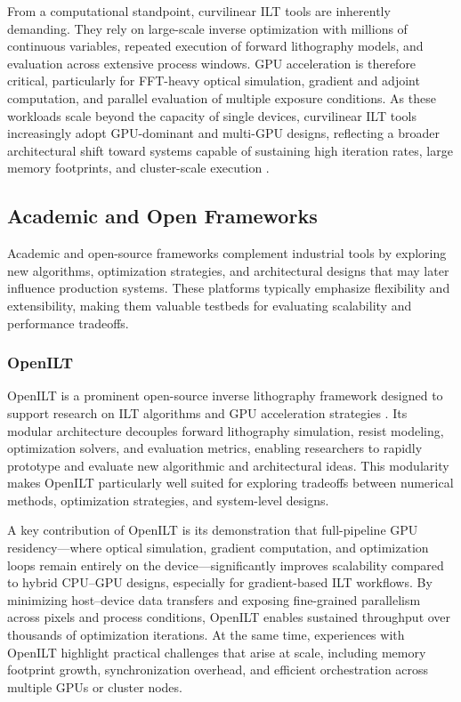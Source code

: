 \documentclass[pdflatex,sn-mathphys-num]{sn-jnl}%
\theoremstyle{thmstyleone}%
\theoremstyle{thmstyletwo}%
\theoremstyle{thmstylethree}%
\begin{document}
From a computational standpoint, curvilinear ILT tools are inherently demanding. They rely on large-scale inverse optimization with millions of continuous variables, repeated execution of forward lithography models, and evaluation across extensive process windows. GPU acceleration is therefore critical, particularly for FFT-heavy optical simulation, gradient and adjoint computation, and parallel evaluation of multiple exposure conditions. As these workloads scale beyond the capacity of single devices, curvilinear ILT tools increasingly adopt GPU-dominant and multi-GPU designs, reflecting a broader architectural shift toward systems capable of sustaining high iteration rates, large memory footprints, and cluster-scale execution \cite{Singh}.

\subsection{Academic and Open Frameworks}
Academic and open-source frameworks complement industrial tools by exploring new algorithms, optimization strategies, and architectural designs that may later influence production systems. These platforms typically emphasize flexibility and extensibility, making them valuable testbeds for evaluating scalability and performance tradeoffs.

\subsubsection{OpenILT}
OpenILT is a prominent open-source inverse lithography framework designed to support research on ILT algorithms and GPU acceleration strategies \cite{Zheng2023}. Its modular architecture decouples forward lithography simulation, resist modeling, optimization solvers, and evaluation metrics, enabling researchers to rapidly prototype and evaluate new algorithmic and architectural ideas. This modularity makes OpenILT particularly well suited for exploring tradeoffs between numerical methods, optimization strategies, and system-level designs.

A key contribution of OpenILT is its demonstration that full-pipeline GPU residency—where optical simulation, gradient computation, and optimization loops remain entirely on the device—significantly improves scalability compared to hybrid CPU–GPU designs, especially for gradient-based ILT workflows. By minimizing host–device data transfers and exposing fine-grained parallelism across pixels and process conditions, OpenILT enables sustained throughput over thousands of optimization iterations. At the same time, experiences with OpenILT highlight practical challenges that arise at scale, including memory footprint growth, synchronization overhead, and efficient orchestration across multiple GPUs or cluster nodes.
\end{document}
